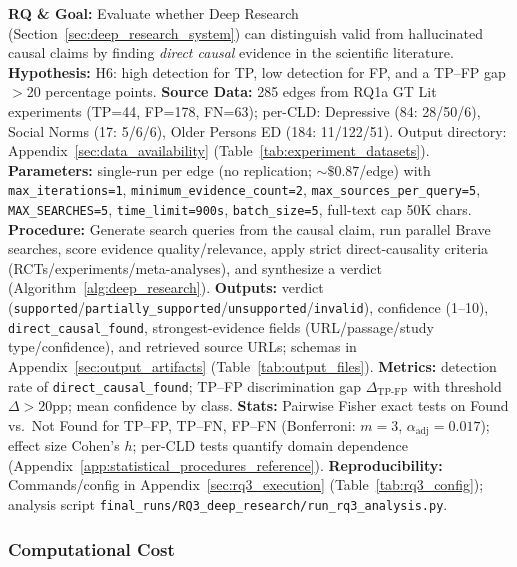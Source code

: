 
\noindent\textbf{RQ \& Goal:} Evaluate whether Deep Research (Section~\ref{sec:deep_research_system}) can distinguish valid from hallucinated causal claims by finding \emph{direct causal} evidence in the scientific literature. \textbf{Hypothesis:} H6: high detection for TP, low detection for FP, and a TP--FP gap $>$20 percentage points. \textbf{Source Data:} 285 edges from RQ1a GT Lit experiments (TP=44, FP=178, FN=63); per-CLD: Depressive (84: 28/50/6), Social Norms (17: 5/6/6), Older Persons ED (184: 11/122/51). Output directory: Appendix~\ref{sec:data_availability} (Table~\ref{tab:experiment_datasets}). \textbf{Parameters:} single-run per edge (no replication; $\sim\$0.87$/edge) with \texttt{max\_iterations=1}, \texttt{minimum\_evidence\_count=2}, \texttt{max\_sources\_per\_query=5}, \texttt{MAX\_SEARCHES=5}, \texttt{time\_limit=900s}, \texttt{batch\_size=5}, full-text cap 50K chars. \textbf{Procedure:} Generate search queries from the causal claim, run parallel Brave searches, score evidence quality/relevance, apply strict direct-causality criteria (RCTs/experiments/meta-analyses), and synthesize a verdict (Algorithm~\ref{alg:deep_research}). \textbf{Outputs:} verdict (\texttt{supported}/\texttt{partially\_supported}/\texttt{unsupported}/\texttt{invalid}), confidence (1--10), \texttt{direct\_causal\_found}, strongest-evidence fields (URL/passage/study type/confidence), and retrieved source URLs; schemas in Appendix~\ref{sec:output_artifacts} (Table~\ref{tab:output_files}). \textbf{Metrics:} detection rate of \texttt{direct\_causal\_found}; TP--FP discrimination gap \(\Delta_{\text{TP-FP}}\) with threshold \(\Delta>20\)pp; mean confidence by class. \textbf{Stats:} Pairwise Fisher exact tests on Found vs.\ Not Found for TP--FP, TP--FN, FP--FN (Bonferroni: $m=3$, $\alpha_{\text{adj}}=0.017$); effect size Cohen's $h$; per-CLD tests quantify domain dependence (Appendix~\ref{app:statistical_procedures_reference}). \textbf{Reproducibility:} Commands/config in Appendix~\ref{sec:rq3_execution} (Table~\ref{tab:rq3_config}); analysis script \texttt{final\_runs/RQ3\_deep\_research/run\_rq3\_analysis.py}.

\subsubsection{Computational Cost}

